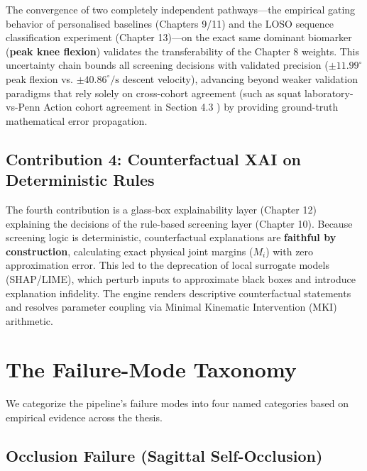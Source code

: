 The convergence of two completely independent pathways—the empirical gating behavior of personalised baselines (Chapters 9/11) and the LOSO sequence classification experiment (Chapter 13)—on the exact same dominant biomarker (\textbf{peak knee flexion}) validates the transferability of the Chapter 8 weights. This uncertainty chain bounds all screening decisions with validated precision ($\pm 11.99^\circ$ peak flexion vs. $\pm 40.86^\circ/\text{s}$ descent velocity), advancing beyond weaker validation paradigms that rely solely on cross-cohort agreement (such as squat laboratory-vs-Penn Action cohort agreement in Section 4.3 \citep{Zhang_Penn_Action_2013}) by providing ground-truth mathematical error propagation.

\subsection{Contribution 4: Counterfactual XAI on Deterministic Rules}
\label{sec:14-1-4-contribution-4-counterfactual-xai-on-deterministic-rules}

The fourth contribution is a glass-box explainability layer (Chapter 12) explaining the decisions of the rule-based screening layer (Chapter 10). Because screening logic is deterministic, counterfactual explanations are \textbf{faithful by construction}, calculating exact physical joint margins ($M_i$) with zero approximation error. This led to the deprecation of local surrogate models (SHAP/LIME), which perturb inputs to approximate black boxes and introduce explanation infidelity. The engine renders descriptive counterfactual statements and resolves parameter coupling via Minimal Kinematic Intervention (MKI) arithmetic.



\section{The Failure-Mode Taxonomy}
\label{sec:14-2-the-failure-mode-taxonomy}


We categorize the pipeline's failure modes into four named categories based on empirical evidence across the thesis.

\subsection{Occlusion Failure (Sagittal Self-Occlusion)}
\label{sec:14-2-1-occlusion-failure-sagittal-self-occlusion}

